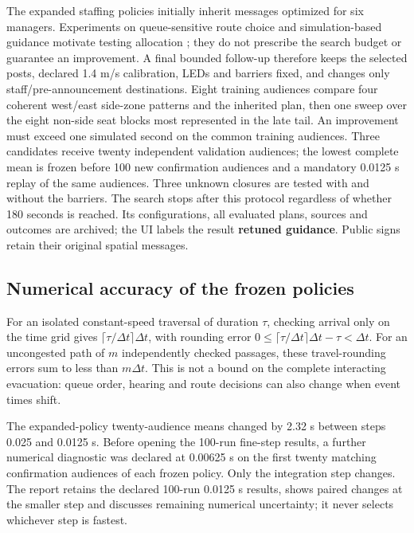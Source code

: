\documentclass[11pt,a4paper]{article}
\begin{document}
The expanded staffing policies initially inherit messages optimized for six managers. Experiments on queue-sensitive route choice and simulation-based guidance motivate testing allocation \cite{R7,R10}; they do not prescribe the search budget or guarantee an improvement. A final bounded follow-up therefore keeps the selected posts, declared 1.4 m/s calibration, LEDs and barriers fixed, and changes only staff/pre-announcement destinations. Eight training audiences compare four coherent west/east side-zone patterns and the inherited plan, then one sweep over the eight non-side seat blocks most represented in the late tail. An improvement must exceed one simulated second on the common training audiences. Three candidates receive twenty independent validation audiences; the lowest complete mean is frozen before 100 new confirmation audiences and a mandatory 0.0125 s replay of the same audiences. Three unknown closures are tested with and without the barriers. The search stops after this protocol regardless of whether 180 seconds is reached. Its configurations, all evaluated plans, sources and outcomes are archived; the UI labels the result \textbf{retuned guidance}. Public signs retain their original spatial messages.


\subsection{Numerical accuracy of the frozen policies}

For an isolated constant-speed traversal of duration $\tau$, checking arrival only on the time grid gives $\lceil\tau/\Delta t\rceil\Delta t$, with rounding error $0\leq\lceil\tau/\Delta t\rceil\Delta t-\tau<\Delta t$. For an uncongested path of $m$ independently checked passages, these travel-rounding errors sum to less than $m\Delta t$. This is not a bound on the complete interacting evacuation: queue order, hearing and route decisions can also change when event times shift.


The expanded-policy twenty-audience means changed by 2.32 s between steps 0.025 and 0.0125 s. Before opening the 100-run fine-step results, a further numerical diagnostic was declared at 0.00625 s on the first twenty matching confirmation audiences of each frozen policy. Only the integration step changes. The report retains the declared 100-run 0.0125 s results, shows paired changes at the smaller step and discusses remaining numerical uncertainty; it never selects whichever step is fastest.
\end{document}
